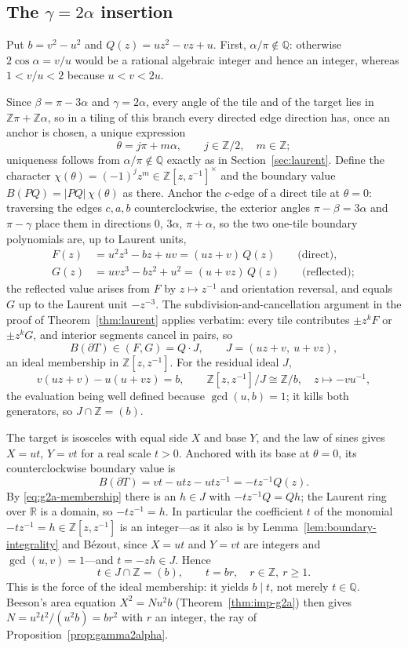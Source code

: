 \documentclass[11pt]{amsart}
\theoremstyle{definition}
\theoremstyle{remark}
\newcommand{\Z}{\mathbb Z}
\newcommand{\Q}{\mathbb Q}
\begin{document}
\subsection{The \texorpdfstring{$\gamma=2\alpha$}{gamma=2 alpha} insertion}

Put $b=v^2-u^2$ and $Q(z)=uz^2-vz+u$.  First, $\alpha/\pi\notin\Q$:
otherwise $2\cos\alpha=v/u$ would be a rational algebraic integer and hence
an integer, whereas $1<v/u<2$ because $u<v<2u$.

Since $\beta=\pi-3\alpha$ and $\gamma=2\alpha$, every angle of the tile and
of the target lies in $\Z\pi+\Z\alpha$, so in a tiling of this branch every
directed edge direction has, once an anchor is chosen, a unique expression
\[
             \theta=j\pi+m\alpha,\qquad j\in\Z/2,\quad m\in\Z;
\]
uniqueness follows from $\alpha/\pi\notin\Q$ exactly as in
Section~\ref{sec:laurent}.  Define the character
$\chi(\theta)=(-1)^jz^m\in\Z[z,z^{-1}]^\times$ and the boundary value
$B(PQ)=|PQ|\,\chi(\theta)$ as there.  Anchor the $c$-edge of a direct tile
at $\theta=0$: traversing the edges $c,a,b$ counterclockwise, the exterior
angles $\pi-\beta=3\alpha$ and $\pi-\gamma$ place them in directions $0$,
$3\alpha$, $\pi+\alpha$, so the two one-tile boundary polynomials are, up to
Laurent units,
\[
\begin{split}
F(z)&=u^2z^3-bz+uv=(uz+v)\,Q(z)\qquad\text{(direct)},\\
G(z)&=uvz^3-bz^2+u^2=(u+vz)\,Q(z)\qquad\text{(reflected)};
\end{split}
\]
the reflected value arises from $F$ by $z\mapsto z^{-1}$ and orientation
reversal, and equals $G$ up to the Laurent unit $-z^{-3}$.  The
subdivision-and-cancellation argument in the proof of
Theorem~\ref{thm:laurent} applies verbatim: every tile contributes
$\pm z^kF$ or $\pm z^kG$, and interior segments cancel in pairs, so
\begin{equation}\label{eq:g2a-membership}
     B(\partial T)\in(F,G)=Q\cdot J,\qquad J=(uz+v,\ u+vz),
\end{equation}
an ideal membership in $\Z[z,z^{-1}]$.  For the residual ideal $J$,
\[
 v(uz+v)-u(u+vz)=b,\qquad
 \Z[z,z^{-1}]/J\cong\Z/b,\quad z\mapsto-vu^{-1},
\]
the evaluation being well defined because $\gcd(u,b)=1$; it kills both
generators, so $J\cap\Z=(b)$.

The target is isosceles with equal side $X$ and base $Y$, and the law of
sines gives $X=ut$, $Y=vt$ for a real scale $t>0$.  Anchored with its base
at $\theta=0$, its counterclockwise boundary value is
\[
 B(\partial T)=vt-utz-utz^{-1}=-tz^{-1}Q(z).
\]
By \eqref{eq:g2a-membership} there is an $h\in J$ with $-tz^{-1}Q=Qh$; the
Laurent ring over $\mathbb R$ is a domain, so $-tz^{-1}=h$.  In particular
the coefficient $t$ of the monomial $-tz^{-1}=h\in\Z[z,z^{-1}]$ is an
integer---as it also is by Lemma~\ref{lem:boundary-integrality} and
B\'ezout, since $X=ut$ and $Y=vt$ are integers and $\gcd(u,v)=1$---and
$t=-zh\in J$.  Hence
\[
                 t\in J\cap\Z=(b),\qquad t=br,\quad r\in\Z,\ r\ge1 .
\]
This is the force of the ideal membership: it yields $b\mid t$, not merely
$t\in\Q$.  Beeson's area equation $X^2=Nu^2b$ (Theorem~\ref{thm:imp-g2a})
then gives $N=u^2t^2/(u^2b)=br^2$ with $r$ an integer, the ray of
Proposition~\ref{prop:gamma2alpha}.
\end{document}
